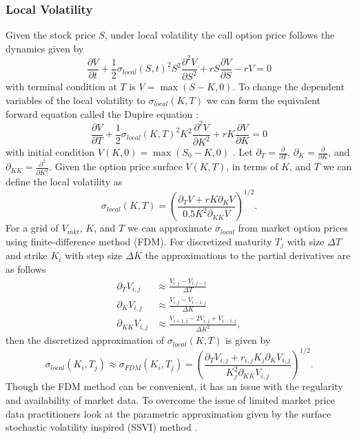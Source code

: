 \documentclass{article}
\theoremstyle{plain}%
\theoremstyle{definition}
\theoremstyle{remark}
\begin{document}
\subsubsection{Local Volatility}
Given the stock price $S$, under local volatility the call option price follows the dynamics given by
\begin{equation*}
	\frac{\partial V}{\partial t} + \frac{1}{2}\sigma_{local}(S,t)^2S^2\frac{\partial^2 V}{\partial S^2}+rS\frac{\partial V}{\partial S} - rV = 0
\end{equation*}with terminal condition at $T$ is $V = \max(S-K,0)$. To change the dependent variables of the local volatility to $\sigma_{local}(K,T)$ we can form the equivalent forward equation called the Dupire equation \citep{dupire-1994}:
\begin{equation}
	\frac{\partial V}{\partial T} + \frac{1}{2}\sigma_{local}(K,T)^2K^2\frac{\partial^2 V}{\partial K^2}+rK\frac{\partial V}{\partial K} = 0
	\label{eq:dupire}
\end{equation}
with initial condition $V(K,0) = \max(S_0-K,0)$ \citep{lee-2002,gatheral-2001-1,gatheral-2001-2}. Let $\partial_T=\frac{\partial}{\partial T}$, $\partial_K=\frac{\partial}{\partial K}$, and $\partial_{KK}=\frac{\partial^2}{\partial K^2}$. Given the option price surface $V(K,T)$, in terms of $K$, and $T$ we can define the local volatility as
\begin{equation*}
	\sigma_{local}(K,T)=\left(\frac{\partial_TV+rK\partial_KV}{0.5K^2\partial_{KK}V}\right)^{1/2}.
\end{equation*}For a grid of $V_{mkt}$, $K$, and $T$ we can approximate  $\sigma_{local}$ from market option prices using finite-difference method (FDM). For discretized maturity $T_j$ with size $\Delta T$ and strike $K_i$ with step size $\Delta K$ the approximations to the partial derivatives are as follows
\begin{align*}
	\partial_T V_{i,j} &\approx \frac{V_{i,j}-V_{i,j-1}}{\Delta T}\\
    \partial_K V_{i,j} &\approx \frac{V_{i,j}-V_{i-1,j}}{\Delta K}\\
    \partial_{KK}V_{i,j} &\approx \frac{V_{i+1,j}-2V_{i,j}+V_{i-1,j}}{\Delta K^2},
\end{align*}then the discretized approximation of $\sigma_{local}(K,T)$ is given by
\begin{equation*}
	\sigma_{local}(K_i,T_j) \approx \sigma_{FDM}(K_i,T_j) = \left(\frac{\partial_TV_{i,j}+r_{i,j}K_{j}\partial_KV_{i,j}}{K_{j}^2\partial_{KK}V_{i,j}}\right)^{1/2}.
\end{equation*}Though the FDM method can be convenient, it has an issue with the regularity and availability of market data. To overcome the issue of limited market price data practitioners look at the parametric approximation given by the surface stochastic volatility inspired (SSVI) method \citep{gatheral-2011,gatheral-2014}.
\end{document}
